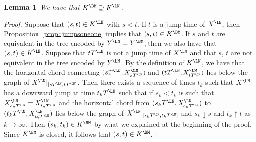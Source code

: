 \documentclass[JEP,XML,SOM,Unicode]{cedram}
\theoremstyle{plain}
\numberwithin{theorem}{section}
\newtheorem{lemma}[theorem]{Lemma}
\theoremstyle{definition}
\begin{document}
\begin{lemma}
\label{lem:levy_net_jump_equiv_dense}
We have that $K^\BM \supseteq K^\LN$.
\end{lemma}
\begin{proof}
Suppose that $(s,t) \in K^\LN$ with $s < t$. If $t$ is a jump time of $X^\LN$, then Proposition~\ref{prop::jumpsoneone} implies that $(s,t) \in K^\BM$. If $s$ and $t$ are equivalent in the tree encoded by $Y^\LN = Y^\BM$, then we also have that $(s,t) \in K^\LN$. Suppose that $t T^\LN$ is not a jump time of $X^\LN$ and that $s$, $t$ are not equivalent in the tree encoded by $Y^\LN$. By the definition of $K^\LN$, we have that the horizontal chord connecting $(s T^\LN,X_{s T^\LN}^\LN)$ and $(t T^\LN,X_{t T^\LN}^\LN)$ lies below the graph of $X^\LN|_{[sT^\LN,t T^\LN]}$. Then there exists a sequence of times $t_k$ such that $X^\LN$ has a downward jump at time $t_k T^\LN$ such that if $s_k < t_k$ is such that $X_{s_k T^\LN}^\LN = X_{t_k T^\LN}^\LN$ and the horizontal chord from $(s_k T^\LN,X_{s_k T^\LN}^\LN)$ to $(t_k T^\LN,X_{t_k T^\LN}^\LN)$ lies below the graph of $X^\LN|_{[s_k T^\LN,t_k T^\LN]}$ and $s_k \downarrow s$ and $t_k \uparrow t$ as $k \to \infty$. Then $(s_k,t_k) \in K^\BM$ by what we explained at the beginning of the proof. Since $K^\BM$ is closed, it follows that $(s,t) \in K^\BM$.
\end{proof}
\end{document}
